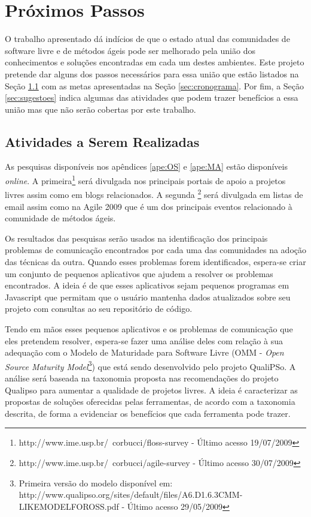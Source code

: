 \chapter{Próximos Passos}
\label{cap:perspectivas}

O trabalho apresentado dá indícios de que o estado atual das
comunidades de software livre e de métodos ágeis pode ser melhorado
pela união dos conhecimentos e soluções encontradas em cada um destes
ambientes. Este projeto pretende dar alguns dos passos necessários
para essa união que estão listados na Seção \ref{sec:atividades} com
as metas apresentadas na Seção \ref{sec:cronograma}. Por fim, a Seção
\ref{sec:sugestoes} indica algumas das atividades que podem trazer
benefícios a essa união mas que não serão cobertas por este trabalho.

\section{Atividades a Serem Realizadas}
\label{sec:atividades}

As pesquisas disponíveis nos apêndices \ref{ape:OS} e \ref{ape:MA}
estão disponíveis \emph{online}. A
primeira\footnote{http://www.ime.usp.br/~corbucci/floss-survey -
  Último acesso 19/07/2009} será divulgada nos principais portais de
apoio a projetos livres assim como em blogs relacionados. A segunda
\footnote{http://www.ime.usp.br/~corbucci/agile-survey - Último acesso
  30/07/2009} será divulgada em listas de email assim como na Agile
2009 que é um dos principais eventos relacionado à comunidade de
métodos ágeis.

Os resultados das pesquisas serão usados na identificação dos
principais problemas de comunicação encontrados por cada uma das
comunidades na adoção das técnicas da outra. Quando esses problemas
forem identificados, espera-se criar um conjunto de pequenos
aplicativos que ajudem a resolver os problemas encontrados. A ideia é
de que esses aplicativos sejam pequenos programas em Javascript que
permitam que o usuário mantenha dados atualizados sobre seu projeto
com consultas ao seu repositório de código.

Tendo em mãos esses pequenos aplicativos e os problemas de comunicação
que eles pretendem resolver, espera-se fazer uma análise deles com
relação à sua adequação com o Modelo de Maturidade para Software Livre
(OMM - \emph{Open Source Maturity Model}\footnote{Primeira versão do
  modelo disponível em:
  http://www.qualipso.org/sites/default/files/A6.D1.6.3CMM-LIKEMODELFOROSS.pdf
  - Último acesso 29/05/2009}) que está sendo desenvolvido pelo
projeto QualiPSo. A análise será baseada na taxonomia proposta nas
recomendações do projeto Qualipso \cite{Malheiros2009} para aumentar a
qualidade de projetos livres. A ideia é caracterizar as propostas de
soluções oferecidas pelas ferramentas, de acordo com a taxonomia
descrita, de forma a evidenciar os benefícios que cada ferramenta pode
trazer.

